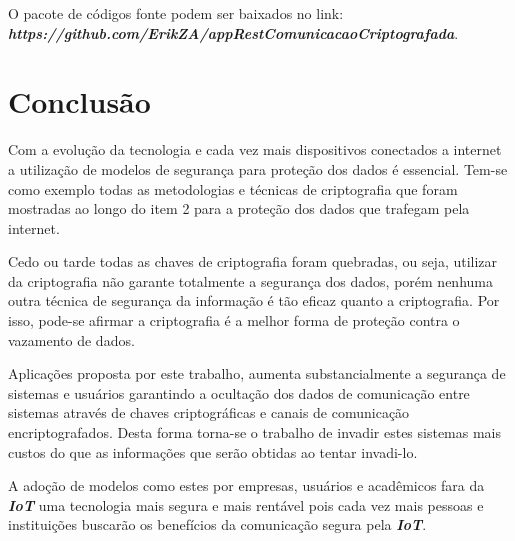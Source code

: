 \documentclass[12pt]{article}
\begin{document}
O pacote de códigos fonte podem ser baixados no link: \textit{\textbf{https://github.com/ErikZA/appRestComunicacaoCriptografada}}.


\section{Conclusão}

Com a evolução da tecnologia e cada vez mais dispositivos conectados a internet a utilização de modelos de segurança para proteção dos dados é essencial. Tem-se como exemplo todas as metodologias e técnicas de criptografia que foram mostradas ao longo do item 2 para a proteção dos dados que trafegam pela internet. 

Cedo ou tarde todas as chaves de criptografia foram quebradas, ou seja, utilizar da criptografia não garante totalmente a segurança dos dados, porém nenhuma outra técnica de segurança da informação é tão eficaz quanto a criptografia. Por isso, pode-se afirmar a criptografia é a melhor forma de proteção contra o vazamento de dados.


Aplicações proposta por este trabalho, aumenta substancialmente a segurança de sistemas e usuários garantindo a  ocultação dos dados de comunicação entre sistemas através de chaves criptográficas e canais de comunicação encriptografados. Desta forma torna-se o trabalho de invadir estes sistemas mais custos do que as informações que serão obtidas ao tentar invadi-lo. 

A adoção de modelos como estes por empresas, usuários e acadêmicos fara da \textit{\textbf{IoT}} uma tecnologia mais segura e mais rentável pois cada vez mais pessoas e instituições buscarão os benefícios da comunicação segura pela \textit{\textbf{IoT}}.








\end{document}
